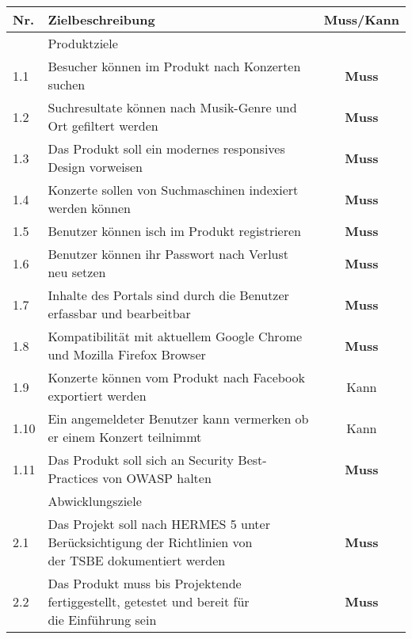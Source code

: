 \begin{longtable}[]{@{}llc@{}}
  \toprule
  Nr.  & Zielbeschreibung                                                                                                                 & Muss/Kann\tabularnewline
  \toprule
       & Produktziele\tabularnewline
  \midrule
  1.1  & Besucher können im Produkt nach Konzerten suchen                                                                                 & \textbf{Muss}\tabularnewline
  1.2  & Suchresultate können nach Musik-Genre und Ort gefiltert werden                                                                   & \textbf{Muss}\tabularnewline
  1.3  & Das Produkt soll ein modernes responsives Design vorweisen                                                                       & \textbf{Muss}\tabularnewline
  1.4  & Konzerte sollen von Suchmaschinen indexiert werden können                                                                        & \textbf{Muss}\tabularnewline
  1.5  & Benutzer können isch im Produkt registrieren                                                                                     & \textbf{Muss}\tabularnewline
  1.6  & Benutzer können ihr Passwort nach Verlust neu setzen                                                                             & \textbf{Muss}\tabularnewline
  1.7  & Inhalte des Portals sind durch die Benutzer erfassbar und bearbeitbar                                                            & \textbf{Muss}\tabularnewline
  1.8  & Kompatibilität mit aktuellem Google Chrome und Mozilla Firefox Browser                                                           & \textbf{Muss}\tabularnewline
  1.9  & Konzerte können vom Produkt nach Facebook exportiert werden                                                                      & Kann\tabularnewline
  1.10 & Ein angemeldeter Benutzer kann vermerken ob er einem Konzert teilnimmt                                                           & Kann\tabularnewline
  1.11 & Das Produkt soll sich an Security Best-Practices von OWASP halten                                                                & \textbf{Muss}\tabularnewline
  \bottomrule
       & Abwicklungsziele\tabularnewline
  \midrule
  2.1  & \makecell[l]{Das Projekt soll nach HERMES 5 unter Berücksichtigung der Richtlinien von                                                                          \\ der TSBE dokumentiert werden} & \textbf{Muss}\tabularnewline
  2.2  & \makecell[l]{Das Produkt muss bis Projektende fertiggestellt, getestet und                                            bereit für                                \\ die Einführung sein}     & \textbf{Muss}\tabularnewline

\end{longtable}
